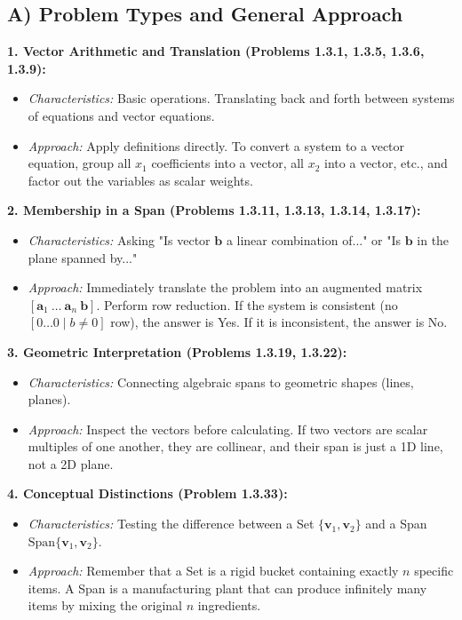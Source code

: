 \documentclass[11pt]{article}
\begin{document}
\subsection{A) Problem Types and General Approach}
\textbf{1. Vector Arithmetic and Translation (Problems 1.3.1, 1.3.5, 1.3.6, 1.3.9):}
\begin{itemize}
    \item \textit{Characteristics:} Basic operations. Translating back and forth between systems of equations and vector equations.
    \item \textit{Approach:} Apply definitions directly. To convert a system to a vector equation, group all $x_1$ coefficients into a vector, all $x_2$ into a vector, etc., and factor out the variables as scalar weights.
\end{itemize}

\textbf{2. Membership in a Span (Problems 1.3.11, 1.3.13, 1.3.14, 1.3.17):}
\begin{itemize}
    \item \textit{Characteristics:} Asking "Is vector $\mathbf{b}$ a linear combination of..." or "Is $\mathbf{b}$ in the plane spanned by..."
    \item \textit{Approach:} Immediately translate the problem into an augmented matrix $[\mathbf{a}_1 \ \dots \ \mathbf{a}_n \ \mathbf{b}]$. Perform row reduction. If the system is consistent (no $[0 \dots 0 \mid b \neq 0]$ row), the answer is Yes. If it is inconsistent, the answer is No.
\end{itemize}

\textbf{3. Geometric Interpretation (Problems 1.3.19, 1.3.22):}
\begin{itemize}
    \item \textit{Characteristics:} Connecting algebraic spans to geometric shapes (lines, planes).
    \item \textit{Approach:} Inspect the vectors before calculating. If two vectors are scalar multiples of one another, they are collinear, and their span is just a 1D line, not a 2D plane. 
\end{itemize}

\textbf{4. Conceptual Distinctions (Problem 1.3.33):}
\begin{itemize}
    \item \textit{Characteristics:} Testing the difference between a Set $\{\mathbf{v}_1, \mathbf{v}_2\}$ and a Span $\text{Span}\{\mathbf{v}_1, \mathbf{v}_2\}$.
    \item \textit{Approach:} Remember that a Set is a rigid bucket containing exactly $n$ specific items. A Span is a manufacturing plant that can produce infinitely many items by mixing the original $n$ ingredients.
\end{itemize}
\end{document}

